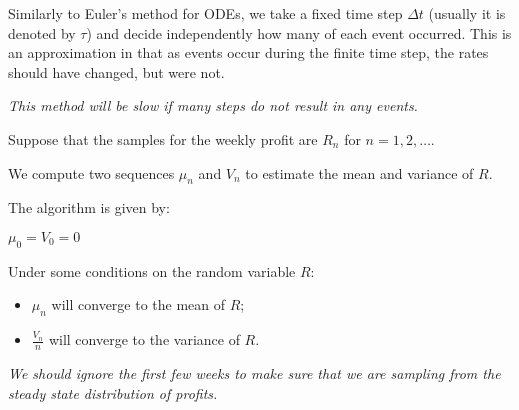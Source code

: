 \begin{SaveDefinition}[key=tau-leaping, title={$\pmb{\tau}$-leaping Method}]

Similarly to Euler's method for ODEs, we take a fixed time step $\Delta t$ (usually it is denoted by $\tau$) and decide independently how many of each event occurred. This is an approximation in that as events occur during the finite time step, the rates should have changed, but were not.
	
\textit{This method will be slow if many steps do not result in any events.}	
\end{SaveDefinition}




\begin{SaveDefinition}[key=WelfordAlgorithm, title ={Welford's Algorithm}]


Suppose that the samples for the weekly profit are $R_n$ for $n=1, 2, \ldots$.

We compute two sequences $\mu_n$ and $V_n$ to estimate the mean and variance of $R$.

The algorithm is given by:

\begin{algorithm}[H]
    $\mu_0 = V_0 = 0$\; 
	\SetAlgoLined\SetArgSty{}
\end{algorithm}

Under some conditions on the random variable $R$:
\begin{itemize}
	\item $\mu_n$ will converge to the mean of $R$;
	\item $\frac{V_n}{n}$ will converge to the variance of $R$.
\end{itemize}

\textit{We should ignore the first few weeks to make sure that we are sampling from the steady state distribution of profits.}
\end{SaveDefinition}



